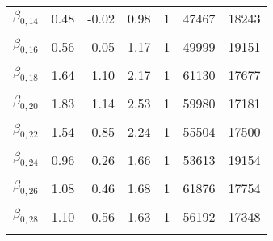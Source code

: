 \begin{table}
\begin{tabular}[t]{lrrrrrr}
$\beta_{0, 14}$ & 0.48 & -0.02 & 0.98 & 1 & 47467 & 18243\\
\cellcolor{gray!6}{$\beta_{0, 15}$} & \cellcolor{gray!6}{1.99} & \cellcolor{gray!6}{1.30} & \cellcolor{gray!6}{2.68} & \cellcolor{gray!6}{1} & \cellcolor{gray!6}{52973} & \cellcolor{gray!6}{17491}\\
$\beta_{0, 16}$ & 0.56 & -0.05 & 1.17 & 1 & 49999 & 19151\\
\cellcolor{gray!6}{$\beta_{0, 17}$} & \cellcolor{gray!6}{3.01} & \cellcolor{gray!6}{2.27} & \cellcolor{gray!6}{3.76} & \cellcolor{gray!6}{1} & \cellcolor{gray!6}{40599} & \cellcolor{gray!6}{18924}\\
$\beta_{0, 18}$ & 1.64 & 1.10 & 2.17 & 1 & 61130 & 17677\\
\cellcolor{gray!6}{$\beta_{0, 19}$} & \cellcolor{gray!6}{0.67} & \cellcolor{gray!6}{0.12} & \cellcolor{gray!6}{1.22} & \cellcolor{gray!6}{1} & \cellcolor{gray!6}{48619} & \cellcolor{gray!6}{17746}\\
$\beta_{0, 20}$ & 1.83 & 1.14 & 2.53 & 1 & 59980 & 17181\\
\cellcolor{gray!6}{$\beta_{0, 21}$} & \cellcolor{gray!6}{1.24} & \cellcolor{gray!6}{0.71} & \cellcolor{gray!6}{1.77} & \cellcolor{gray!6}{1} & \cellcolor{gray!6}{59451} & \cellcolor{gray!6}{18118}\\
$\beta_{0, 22}$ & 1.54 & 0.85 & 2.24 & 1 & 55504 & 17500\\
\cellcolor{gray!6}{$\beta_{0, 23}$} & \cellcolor{gray!6}{2.52} & \cellcolor{gray!6}{1.97} & \cellcolor{gray!6}{3.07} & \cellcolor{gray!6}{1} & \cellcolor{gray!6}{48369} & \cellcolor{gray!6}{19022}\\
$\beta_{0, 24}$ & 0.96 & 0.26 & 1.66 & 1 & 53613 & 19154\\
\cellcolor{gray!6}{$\beta_{0, 25}$} & \cellcolor{gray!6}{1.07} & \cellcolor{gray!6}{0.59} & \cellcolor{gray!6}{1.56} & \cellcolor{gray!6}{1} & \cellcolor{gray!6}{55599} & \cellcolor{gray!6}{17929}\\
$\beta_{0, 26}$ & 1.08 & 0.46 & 1.68 & 1 & 61876 & 17754\\
\cellcolor{gray!6}{$\beta_{0, 27}$} & \cellcolor{gray!6}{1.04} & \cellcolor{gray!6}{0.33} & \cellcolor{gray!6}{1.73} & \cellcolor{gray!6}{1} & \cellcolor{gray!6}{53481} & \cellcolor{gray!6}{18073}\\
$\beta_{0, 28}$ & 1.10 & 0.56 & 1.63 & 1 & 56192 & 17348\\
\cellcolor{gray!6}{$\beta_{0, 29}$} & \cellcolor{gray!6}{1.65} & \cellcolor{gray!6}{1.12} & \cellcolor{gray!6}{2.19} & \cellcolor{gray!6}{1} & \cellcolor{gray!6}{57856} & \cellcolor{gray!6}{16590}\\

\end{tabular}
\end{table}
